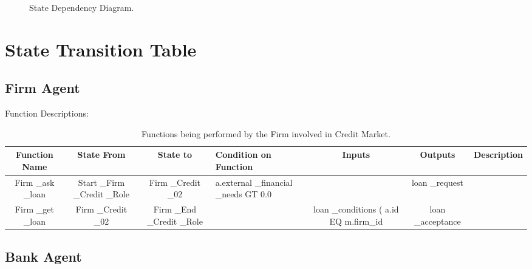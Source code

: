  \begin{figure}[!htb]
 \begin{center}
 \caption{State Dependency Diagram.} \label{fig:statecredit}
 \end{center}
 \end{figure}

\section{State Transition Table}

\subsection{Firm Agent}

Function Descriptions:
\begin{landscape}
\begin{table}[!htb]\caption{Functions being performed by the Firm involved in Credit Market.}
\begin{center}
\begin{tabular}{|c|c|c|l|c|c|l|}
\hline
Function Name & State From & State to & Condition on Function & Inputs & Outputs & Description \\
\hline
{\parbox[l]{3cm}{Firm \_ask \_loan}}&
{\parbox[l]{3cm}{Start \_Firm \_Credit \_Role}}&
{\parbox[l]{3cm}{Firm \_Credit \_02}}&
{\parbox[l]{3cm}{a.external \_financial \_needs GT 0.0}}
&
&loan \_request &
\\
\hline

{\parbox[l]{3cm}{Firm \_get \_loan}}& {\parbox[l]{3cm}{Firm \_Credit
\_02}}& {\parbox[l]{3cm}{Firm \_End \_Credit \_Role}}&
&{\parbox[l]{3cm}{loan \_conditions ( a.id EQ m.firm\_id}} &
{\parbox[l]{3cm}{loan \_acceptance}}&\\
\hline


\end{tabular}\end{center}\label{tab:creditbankfn}
\end{table}
\end{landscape}

\subsection{Bank Agent}

